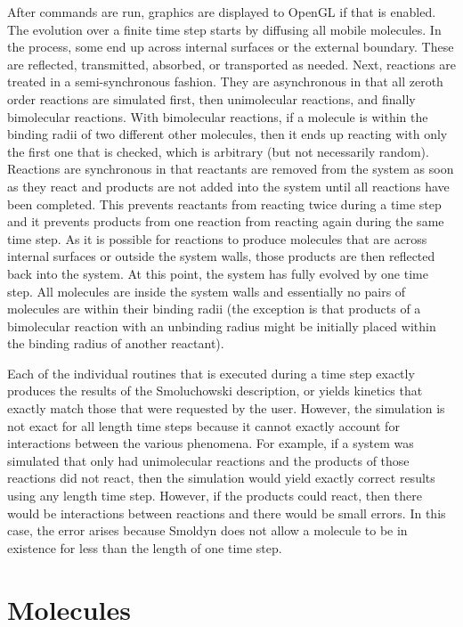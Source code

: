 \documentclass {book}
\begin{document}
After commands are run, graphics are displayed to OpenGL if that is enabled. The evolution over a finite time step starts by diffusing all mobile molecules. In the process, some end up across internal surfaces or the external boundary. These are reflected, transmitted, absorbed, or transported as needed. Next, reactions are treated in a semi-synchronous fashion. They are asynchronous in that all zeroth order reactions are simulated first, then unimolecular reactions, and finally bimolecular reactions. With bimolecular reactions, if a molecule is within the binding radii of two different other molecules, then it ends up reacting with only the first one that is checked, which is arbitrary (but not necessarily random). Reactions are synchronous in that reactants are removed from the system as soon as they react and products are not added into the system until all reactions have been completed. This prevents reactants from reacting twice during a time step and it prevents products from one reaction from reacting again during the same time step. As it is possible for reactions to produce molecules that are across internal surfaces or outside the system walls, those products are then reflected back into the system. At this point, the system has fully evolved by one time step. All molecules are inside the system walls and essentially no pairs of molecules are within their binding radii (the exception is that products of a bimolecular reaction with an unbinding radius might be initially placed within the binding radius of another reactant).

Each of the individual routines that is executed during a time step exactly produces the results of the Smoluchowski description, or yields kinetics that exactly match those that were requested by the user. However, the simulation is not exact for all length time steps because it cannot exactly account for interactions between the various phenomena. For example, if a system was simulated that only had unimolecular reactions and the products of those reactions did not react, then the simulation would yield exactly correct results using any length time step. However, if the products could react, then there would be interactions between reactions and there would be small errors. In this case, the error arises because Smoldyn does not allow a molecule to be in existence for less than the length of one time step.

\chapter{Molecules}
\end{document}
